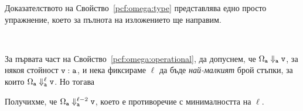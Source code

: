 \begin{hint}
  Доказателството на Свойство~\ref{pcf:omega:type} представлява едно просто упражнение, което за пълнота на изложението ще направим.

  \begin{figure}[H]
    \begin{subfigure}{0.5\textwidth}
      \begin{prooftree}
      \end{prooftree}
    \end{subfigure}
    ~
    \begin{subfigure}{0.5\textwidth}
      \begin{prooftree}
      \end{prooftree}
    \end{subfigure}
  \end{figure}
  
  За първата част на Свойство~\ref{pcf:omega:operational}, да допуснем, че $\Omega_{\vv{a}} \Downarrow_{\vv{a}} \vv{v}$, за някоя стойност $\type{v}{a}$, и нека фиксираме $\ell$
  да бъде {\em най-малкият} брой стъпки, за които $\Omega_{\vv{a}} \Downarrow^{\ell}_{\vv{a}} \vv{v}$.
  Но тогава
  \begin{prooftree}
  \end{prooftree}
  Получихме, че $\Omega_{\vv{a}} \Downarrow^{\ell-2}_{\vv{a}} \vv{v}$, което е противоречие с минималността на $\ell$.


\end{hint}
